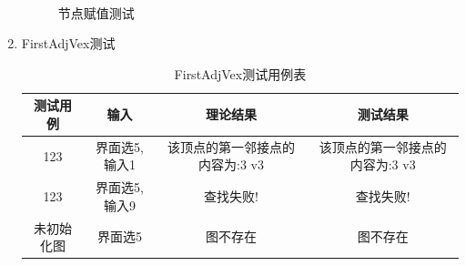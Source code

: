 \documentclass[supercite]{HustGraduPaper}
\theoremstyle{definition}
\begin{document}
\begin{enumerate}
\begin{figure}[htb]
		      \\
		      \caption{节点赋值测试}
	      \end{figure}
	      \newpage
	\item FirstAdjVex测试
	      \begin{table}[htb]
		      \begin{center}
			      \setlength{\tabcolsep}{2.0mm}
			      \caption{FirstAdjVex测试用例表}
			      \label{t5}
			      \begin{tabular}{|c|c|c|c|}
				      \hline
				      测试用例   & 输入          & 理论结果                        & 测试结果                        \\
				      \hline
				      \hline
				      123        & 界面选5,输入1 & 该顶点的第一邻接点的内容为:3 v3 & 该顶点的第一邻接点的内容为:3 v3 \\
				      \hline
				      123        & 界面选5,输入9 & 查找失败!                       & 查找失败!                       \\
				      \hline
				      未初始化图 & 界面选5       & 图不存在                        & 图不存在                        \\
				      \hline
			      \end{tabular}
		      \end{center}
	      \end{table}
	      \begin{figure}[htb]
		      \centering
		      \quad

\end{figure}
\end{enumerate}
\end{document}
